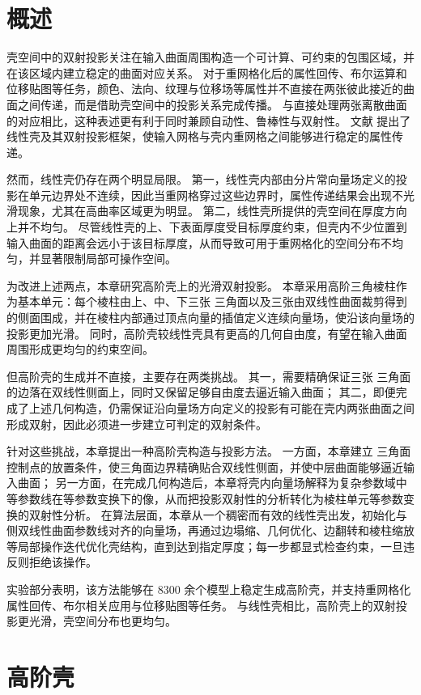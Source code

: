 \section{概述}\label{sec:chap3-overview}
壳空间中的双射投影关注在输入曲面周围构造一个可计算、可约束的包围区域，并在该区域内建立稳定的曲面对应关系。
对于重网格化后的属性回传、布尔运算和位移贴图等任务，颜色、法向、纹理与位移场等属性并不直接在两张彼此接近的曲面之间传递，而是借助壳空间中的投影关系完成传播。
与直接处理两张离散曲面的对应相比，这种表述更有利于同时兼顾自动性、鲁棒性与双射性。
文献\cite{Jiang2020BijectivePI} 提出了线性壳及其双射投影框架，使输入网格与壳内重网格之间能够进行稳定的属性传递。

然而，线性壳仍存在两个明显局限。
第一，线性壳内部由分片常向量场定义的投影在单元边界处不连续，因此当重网格穿过这些边界时，属性传递结果会出现不光滑现象，尤其在高曲率区域更为明显。
第二，线性壳所提供的壳空间在厚度方向上并不均匀。
尽管线性壳的上、下表面厚度受目标厚度约束，但壳内不少位置到输入曲面的距离会远小于该目标厚度，从而导致可用于重网格化的空间分布不均匀，并显著限制局部可操作空间。

为改进上述两点，本章研究高阶壳上的光滑双射投影。
本章采用高阶三角棱柱作为基本单元：每个棱柱由上、中、下三张 \Bezier 三角面以及三张由双线性曲面裁剪得到的侧面围成，并在棱柱内部通过顶点向量的插值定义连续向量场，使沿该向量场的投影更加光滑。
同时，高阶壳较线性壳具有更高的几何自由度，有望在输入曲面周围形成更均匀的约束空间。

但高阶壳的生成并不直接，主要存在两类挑战。
其一，需要精确保证三张 \Bezier 三角面的边落在双线性侧面上，同时又保留足够自由度去逼近输入曲面；
其二，即便完成了上述几何构造，仍需保证沿向量场方向定义的投影有可能在壳内两张曲面之间形成双射，因此必须进一步建立可判定的双射条件。

针对这些挑战，本章提出一种高阶壳构造与投影方法。
一方面，本章建立 \Bezier 三角面控制点的放置条件，使三角面边界精确贴合双线性侧面，并使中层曲面能够逼近输入曲面；
另一方面，在完成几何构造后，本章将壳内向量场解释为复杂参数域中等参数线在等参数变换下的像，从而把投影双射性的分析转化为棱柱单元等参数变换的双射性分析。
在算法层面，本章从一个稠密而有效的线性壳出发，初始化与侧双线性曲面参数线对齐的向量场，再通过边塌缩、几何优化、边翻转和棱柱缩放等局部操作迭代优化壳结构，直到达到指定厚度；每一步都显式检查约束，一旦违反则拒绝该操作。

实验部分表明，该方法能够在 8300 余个模型上稳定生成高阶壳，并支持重网格化属性回传、布尔相关应用与位移贴图等任务。
与线性壳相比，高阶壳上的双射投影更光滑，壳空间分布也更均匀。

\section{高阶壳} \label{sec:method}
